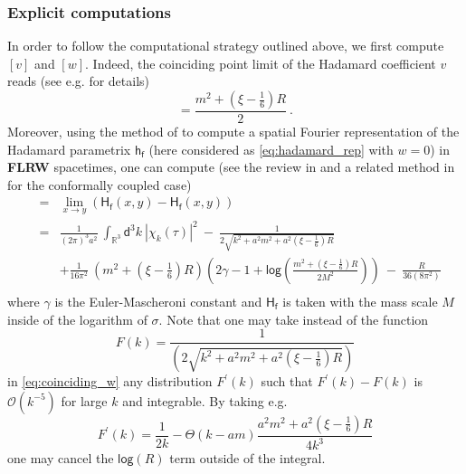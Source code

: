 \documentclass[11pt]{book}
\renewcommand{\log}{\mathsf{log}}
\newcommand{\abs}[1]{\left|#1\right|}
\newcommand{\Ocal}{\mathcal{O}}
\newcommand{\Rbb}{\mathbb{R}}
\newcommand{\Hsf}{\mathsf{H}}
\newcommand{\dsf}{\mathsf{d}}
\newcommand{\fsf}{\mathsf{f}}
\newcommand{\hsf}{\mathsf{h}}
\theoremstyle{break}
\begin{document}
\subsubsection{Explicit computations}


In order to follow the computational strategy outlined above, we first compute $[v]$ and $[w]$.  Indeed, the coinciding point limit of the Hadamard coefficient $v$ reads (see e.g. \cite[Section III.1.2]{hack_backreaction_2010} for details)
%
\begin{equation*}
[v]=\frac{m^2+\left(\xi-\frac16\right)R}{2} \ .
\label{eq:coinciding_v}
\end{equation*}
%
Moreover, using the method of \cite{schlemmer_2010} to compute a spatial Fourier representation of the Hadamard parametrix $\hsf_\fsf$ (here considered as \eqref{eq:hadamard_rep} with $w=0$) in \textbf{FLRW} spacetimes, one can compute (see the review in \cite{degner_2013} and a related method in \cite{pinamonti_initial_2011} for the conformally coupled case)
%
\begin{eqnarray}
[w] &=& \lim_{x\to y} \left(\Hsf_\fsf(x,y) - \Hsf_\fsf(x,y) \right) \nonumber \\
&=& \frac{1}{(2\pi)^3 a^2} \ \int_{\Rbb^3} \dsf^3k \ \abs{\chi_k(\tau)}^2 \ - \ \frac{1}{2\sqrt{k^2+a^2m^2+a^2\left(\xi-\frac16\right)R}} \nonumber \\
%
&& + \frac{1}{16\pi^2} \ \left(m^2+\left(\xi-\frac16\right)R\right)\left(2\gamma-1+\log\left(
\frac{m^2+\left(\xi-\frac16\right)R}{2M^2}\right)\right) \ - \ \frac{R}{36(8\pi^2)} \nonumber \\
\label{eq:coinciding_w} 
\end{eqnarray}
%
where $\gamma$ is the Euler-Mascheroni constant and $\Hsf_\fsf$ is taken with the mass scale $M$ inside of the logarithm of $\sigma$. Note that one may take instead of the function 
%
\begin{equation*}
F(k) = \frac{1}{(2\sqrt{k^2+a^2m^2+a^2\left(\xi-\frac16\right)R})}
\end{equation*}
%
in \eqref{eq:coinciding_w} any distribution $F^\prime(k)$ such that $F^\prime(k)-F(k)$ is $\Ocal(k^{-5})$ for large $k$ and integrable. By taking e.g. 
%
\begin{equation*}
F^\prime(k) = \frac{1}{2k} - \Theta(k-am)\frac{a^2 m^2 + a^2 \left( \xi - \frac16 \right) R}{4k^3}
\end{equation*}
%
one may cancel the $\log\left(R\right)$ term outside of the integral.
\end{document}
